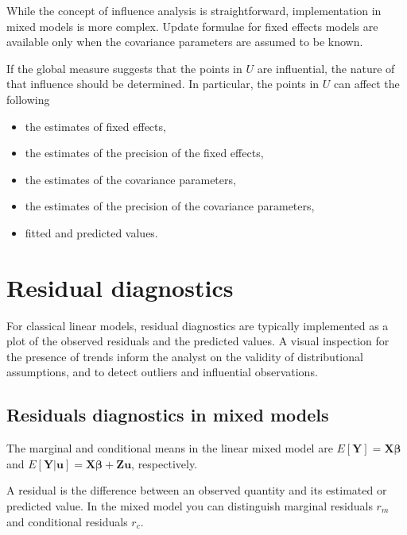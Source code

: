\documentclass[a4paper,12pt]{article}
\begin{document}

While the concept of influence analysis is straightforward, implementation in mixed models is more complex. Update formulae for fixed effects models are available only when the covariance parameters are assumed to be known.

If the global measure suggests that the points in $U$ are influential, the nature of that influence should be determined. In particular, the points in $U$ can affect the following

\begin{itemize}
	\item the estimates of fixed effects,
	\item the estimates of the precision of the fixed effects,
	\item the estimates of the covariance parameters,
	\item the estimates of the precision of the covariance parameters,
	\item fitted and predicted values.
\end{itemize}


\newpage
\section{Residual diagnostics} %
For classical linear models, residual diagnostics are typically implemented as a plot of the observed residuals and the predicted values. A visual inspection for the presence of trends inform the analyst on the validity of distributional assumptions, and to detect outliers and influential observations.




\subsection{Residuals diagnostics in mixed models}

The marginal and conditional means in the linear mixed model are
$E[\boldsymbol{Y}] = \boldsymbol{X}\boldsymbol{\beta}$ and
$E[\boldsymbol{Y|\boldsymbol{u}}] = \boldsymbol{X}\boldsymbol{\beta} + \boldsymbol{Z}\boldsymbol{u}$, respectively.

A residual is the difference between an observed quantity and its estimated or predicted value. In the mixed
model you can distinguish marginal residuals $r_m$ and conditional residuals $r_c$. 
\end{document}
